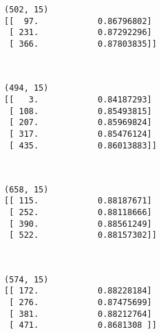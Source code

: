 \documentclass{article}
\begin{document}
    \begin{Verbatim}[commandchars=\\\{\}]
(502, 15)
[[  97.            0.86796802]
 [ 231.            0.87292296]
 [ 366.            0.87803835]]
    \end{Verbatim}

    \begin{center}
    \end{center}
    { \hspace*{\fill} \\}
    
    \begin{Verbatim}[commandchars=\\\{\}]
(494, 15)
[[   3.            0.84187293]
 [ 108.            0.85493815]
 [ 207.            0.85969824]
 [ 317.            0.85476124]
 [ 435.            0.86013883]]
    \end{Verbatim}

    \begin{center}
    \end{center}
    { \hspace*{\fill} \\}
    
    \begin{Verbatim}[commandchars=\\\{\}]
(658, 15)
[[ 115.            0.88187671]
 [ 252.            0.88118666]
 [ 390.            0.88561249]
 [ 522.            0.88157302]]
    \end{Verbatim}

    \begin{center}
    \end{center}
    { \hspace*{\fill} \\}
    
    \begin{Verbatim}[commandchars=\\\{\}]
(574, 15)
[[ 172.            0.88228184]
 [ 276.            0.87475699]
 [ 381.            0.88212764]
 [ 471.            0.8681308 ]]
    \end{Verbatim}

    \begin{center}
    \end{center}
    { \hspace*{\fill} \\}
    
\end{document}
